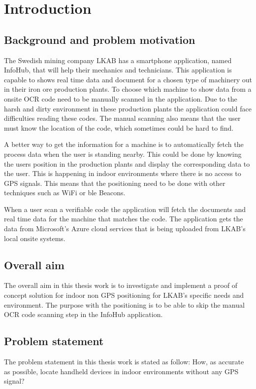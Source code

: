 \chapter{Introduction}\label{sec:intro} 

\section{Background and problem motivation}\label{sec:introBackground}
The Swedish mining company LKAB has
a smartphone application, named InfoHub, that will help their mechanics and
technicians.  This application is capable to shows real time data and document
for a chosen type of machinery out in their iron ore production plants.  To
choose which machine to show data from a onsite OCR code need to be manually
scanned in the application.  Due to the harsh and dirty environment in these
production plants the application could face difficulties reading these codes.
The manual scanning also means that the user must know the location of the code,
which sometimes could be hard to find.

\bigskip

A better way to get the information for a machine is to automatically fetch the
process data when the user is standing nearby.  This could be done by knowing
the users position in the production plants and display the corresponding data
to the user.  This is happening in indoor environments where there is no access
to GPS signals.  This means that the positioning need to be done with other
techniques such as WiFi or \acrlong{ble} Beacons.

\bigskip

When a user scan a verifiable code the application will fetch the documents and
real time data for the machine that matches the code.  The application gets the
data from Microsoft's Azure cloud services that is being uploaded from LKAB's
local onsite systems.


\section{Overall aim}\label{sec:introOverallAim}
The overall aim in this thesis work is to investigate and implement a proof of concept solution for indoor non GPS positioning for LKAB's specific needs and environment.
The purpose with the positioning is to be able to skip the manual OCR code scanning step in the InfoHub application.


\section{Problem statement}\label{sec:introProblemStatement}
The problem statement in this thesis work is stated as follow: How, as accurate as possible, locate handheld devices in indoor environments without any GPS signal?


